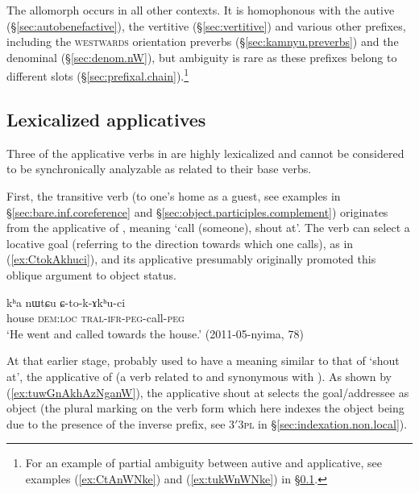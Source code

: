 The allomorph  occurs in all other contexts. It is homophonous with the autive (§\ref{sec:autobenefactive}), the vertitive (§\ref{sec:vertitive}) and various other prefixes, including the \textsc{westwards} orientation preverbs (§\ref{sec:kamnyu.preverbs}) and the denominal  (§\ref{sec:denom.nW}), but ambiguity is rare as these prefixes belong to different slots (§\ref{sec:prefixal.chain}).\footnote{For an example of partial ambiguity between autive and applicative, see examples (\ref{ex:CtAnWNke}) and (\ref{ex:tukWnWNke}) in §\ref{sec:applicative.lexicalized}. } 


\subsection{Lexicalized applicatives} \label{sec:applicative.lexicalized} 
Three of the applicative verbs in  are highly lexicalized and cannot be considered to be synchronically analyzable as related to their base verbs.
 
First, the transitive verb  (to one's home as a guest, see examples in §\ref{sec:bare.inf.coreference} and §\ref{sec:object.participles.complement}) originates from the applicative  of , meaning `call (someone), shout at'. The verb  can select a locative goal (referring to the direction towards which one calls), as in (\ref{ex:CtokAkhuci}), and its applicative  presumably originally promoted this oblique argument to object status.

\begin{exe}
\ex \label{ex:CtokAkhuci}
\gll kʰa nɯtɕu ɕ-to-k-ɤkʰu-ci \\
house \textsc{dem}:\textsc{loc} \textsc{tral}-\textsc{ifr}-\textsc{peg}-call-\textsc{peg} \\
\glt `He went and called towards the house.' (2011-05-nyima, 78)
\end{exe}

At that earlier stage,  probably used to have a meaning similar to that of  `shout at', the applicative of  (a verb related to and synonymous with ). As shown by (\ref{ex:tuwGnAkhAzNganW}), the applicative  {shout at} selects the goal/addressee as object (the plural marking on the verb form which here indexes the object being due to the presence of the inverse prefix, see 3$'$\fl{}\textsc{3pl} in §\ref{sec:indexation.non.local}). 

